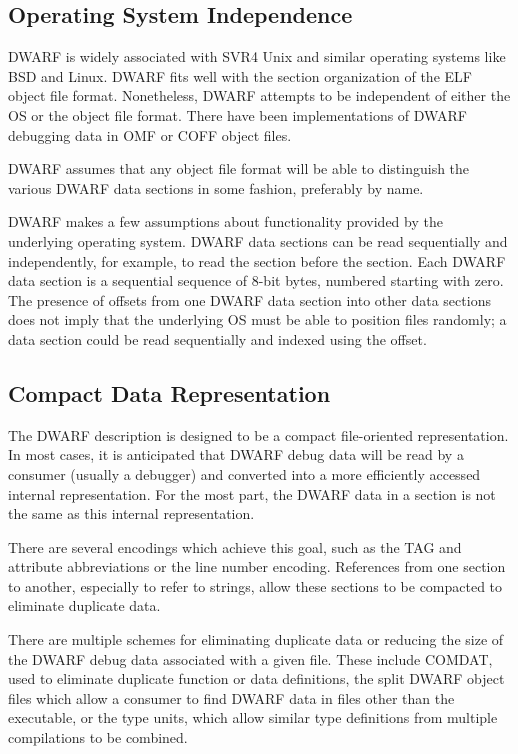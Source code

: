 \subsection{Operating System Independence}
DWARF is widely associated with SVR4 Unix and similar operating systems like BSD and Linux.  DWARF fits well with the section organization of the ELF object file format. Nonetheless, DWARF attempts to be independent of either the OS or the object file format.  There have been implementations of DWARF debugging data in OMF or COFF object files. 

DWARF assumes that any object file format will be able to distinguish the various DWARF data sections in some fashion, preferably by name. 

DWARF makes a few assumptions about functionality provided by the underlying operating system.  DWARF data sections can be read sequentially and independently, for example, to read the \dotdebugabbrev{} section before the \dotdebuginfo{} section.  Each DWARF data section is a sequential sequence of 8-bit bytes, numbered starting with zero.  The presence of offsets from one DWARF data section into other data sections does not imply that the underlying OS must be able to position files randomly; a data section could be read sequentially and indexed using the offset. 

\subsection{Compact Data Representation} 
The DWARF description is designed to be a compact file-oriented representation. In most cases, it is anticipated that DWARF debug data will be read by a consumer (usually a debugger) and converted into a more efficiently accessed internal representation.  For the most part, the DWARF data in a section is not the same as this internal representation. 

There are several encodings which achieve this goal, such as the TAG and attribute abbreviations or the line number encoding.  References from one section to another, especially to refer to strings, allow these sections to be compacted to eliminate duplicate data. 

There are multiple schemes for eliminating duplicate data or reducing the size of the DWARF debug data associated with a given file.  These include COMDAT, used to eliminate duplicate function or data definitions, the split DWARF object files which allow a consumer to find DWARF data in files other than the executable, or the type units, which allow similar type definitions from multiple compilations to be combined. 

